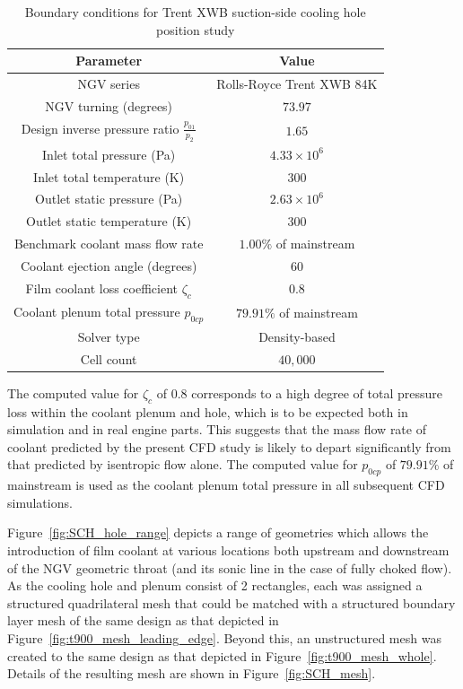\documentclass[a4paper, 11pt, oneside]{report}
\begin{document}
\begin{table}[H]
\caption{Boundary conditions for Trent XWB suction-side cooling hole position study}
\label{SCH_parameters}
\begin{center}
\begin{tabular}{|c|c|}
\hline
Parameter & Value\\
\hline
NGV series & Rolls-Royce Trent XWB 84K\\
NGV turning (degrees) & $73.97$\\
Design inverse pressure ratio $\frac{p_{01}}{p_2}$ & $1.65$\\
Inlet total pressure (Pa) & $4.33 \times 10^6$\\
Inlet total temperature (K) & $300$\\
Outlet static pressure (Pa) & $2.63 \times 10^6$\\
Outlet static temperature (K) & $300$\\
Benchmark coolant mass flow rate & $1.00\%$ of mainstream\\
Coolant ejection angle (degrees) & $60$\\
Film coolant loss coefficient $\zeta_c$ & $0.8$\\
Coolant plenum total pressure $p_{0cp}$ & $79.91\%$ of mainstream\\
Solver type & Density-based\\
Cell count & $40,000$\\
\hline
\end{tabular}
\end{center}
\end{table}

The computed value for $\zeta_c$ of $0.8$ corresponds to a high degree of total pressure loss within the coolant plenum and hole, which is to be expected both in simulation and in real engine parts. This suggests that the mass flow rate of coolant predicted by the present CFD study is likely to depart significantly from that predicted by isentropic flow alone. The computed value for $p_{0cp}$ of $79.91\%$ of mainstream is used as the coolant plenum total pressure in all subsequent CFD simulations.

Figure~\ref{fig:SCH_hole_range} depicts a range of geometries which allows the introduction of film coolant at various locations both upstream and downstream of the NGV geometric throat (and its sonic line in the case of fully choked flow). As the cooling hole and plenum consist of 2 rectangles, each was assigned a structured quadrilateral mesh that could be matched with a structured boundary layer mesh of the same design as that depicted in Figure~\ref{fig:t900_mesh_leading_edge}. Beyond this, an unstructured mesh was created to the same design as that depicted in Figure~\ref{fig:t900_mesh_whole}. Details of the resulting mesh are shown in Figure~\ref{fig:SCH_mesh}.
\end{document}

